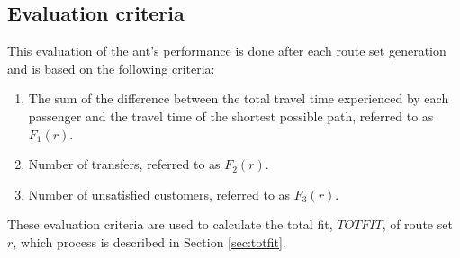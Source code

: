 \subsection{Evaluation criteria} 
This evaluation of the ant's performance is done after each route set generation and is based on the following criteria:
\begin{enumerate}
\item \label{itm:criteriaTotalTravelTime} The sum of the difference between the total travel time experienced by each passenger and the travel time of the shortest possible path, referred to as $F_1(r)$.
\item \label{itm:f2} Number of transfers, referred to as $F_2(r)$.
\item Number of unsatisfied customers, referred to as $F_3(r)$. 
\end{enumerate}
These evaluation criteria are used to calculate the total fit, $TOTFIT$, of route set $r$, which process is described in Section \vref{sec:totfit}.



